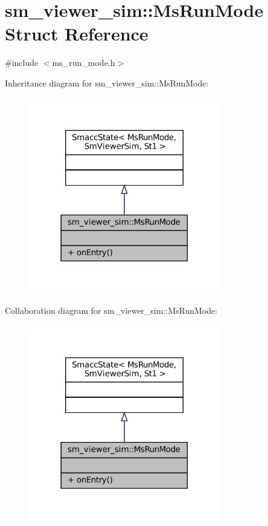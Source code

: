 \hypertarget{structsm__viewer__sim_1_1MsRunMode}{}\section{sm\+\_\+viewer\+\_\+sim\+:\+:Ms\+Run\+Mode Struct Reference}
\label{structsm__viewer__sim_1_1MsRunMode}


{\ttfamily \#include $<$ms\+\_\+run\+\_\+mode.\+h$>$}



Inheritance diagram for sm\+\_\+viewer\+\_\+sim\+:\+:Ms\+Run\+Mode\+:
\nopagebreak
\begin{figure}[H]
\begin{center}
\leavevmode
\includegraphics[width=237pt]{structsm__viewer__sim_1_1MsRunMode__inherit__graph}
\end{center}
\end{figure}


Collaboration diagram for sm\+\_\+viewer\+\_\+sim\+:\+:Ms\+Run\+Mode\+:
\nopagebreak
\begin{figure}[H]
\begin{center}
\leavevmode
\includegraphics[width=237pt]{structsm__viewer__sim_1_1MsRunMode__coll__graph}
\end{center}
\end{figure}

